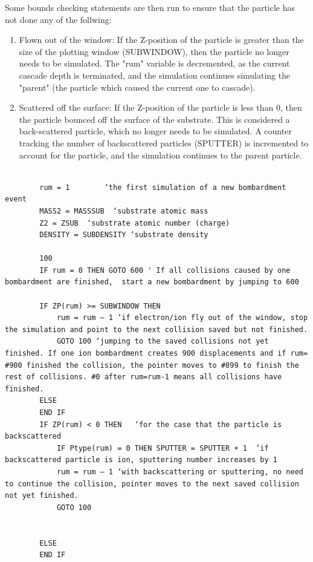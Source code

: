 \documentclass[10pt, reqno]{exam}
\begin{document}
Some bounds checking statements are then run to ensure that the particle has not done any of the follwing:

\begin{enumerate}
    \item Flown out of the window: If the Z-position of the particle is greater than the size of the plotting window (SUBWINDOW), then the particle no longer needs to be simulated. The "rum" variable is decremented, as the current cascade depth is terminated, and the simulation continues simulating the "parent" (the particle which caused the current one to cascade).
    \item Scattered off the surface: If the Z-position of the particle is less than 0, then the particle bounced off the surface of the substrate. This is considered a back-scattered particle, which no longer needs to be simulated. A counter tracking the number of backscattered particles (SPUTTER) is incremented to account for the particle, and the simulation continues to the parent particle.
\end{enumerate}

\begin{verbatim}
    
        rum = 1        ‘the first simulation of a new bombardment event 
        MASS2 = MASSSUB  ‘substrate atomic mass
        Z2 = ZSUB  ‘substrate atomic number (charge)
        DENSITY = SUBDENSITY ‘substrate density
    
        100
        IF rum = 0 THEN GOTO 600 ' If all collisions caused by one bombardment are finished,  start a new bombardment by jumping to 600
    
        IF ZP(rum) >= SUBWINDOW THEN 
            rum = rum – 1 ‘if electron/ion fly out of the window, stop the simulation and point to the next collision saved but not finished. 
            GOTO 100 ‘jumping to the saved collisions not yet finished. If one ion bombardment creates 900 displacements and if rum= #900 finished the collision, the pointer moves to #899 to finish the rest of collisions. #0 after rum=rum-1 means all collisions have finished. 
        ELSE
        END IF
        IF ZP(rum) < 0 THEN   ‘for the case that the particle is backscattered
            IF Ptype(rum) = 0 THEN SPUTTER = SPUTTER + 1  ‘if backscattered particle is ion, sputtering number increases by 1
            rum = rum – 1 ‘with backscattering or sputtering, no need to continue the collision, pointer moves to the next saved collision not yet finished. 
            GOTO 100
    
    
        ELSE
        END IF
\end{verbatim}
\end{document}
